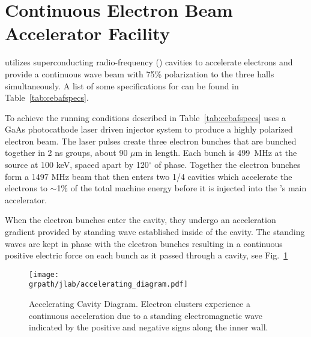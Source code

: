 \section{Continuous Electron Beam Accelerator Facility}\label{sec:cebaf.desc}

 utilizes superconducting radio-frequency (\label{abbr:srf}) cavities to accelerate electrons and provide a continuous wave beam with 75\% polarization to the three halls simultaneously. A list of some specifications for  can be found in Table~\ref{tab:cebafspecs}.
 

To achieve the running conditions described in Table~\ref{tab:cebafspecs}  uses a GaAs photocathode laser driven injector system to produce a highly polarized electron beam. The laser pulses create three electron bunches that are bunched together in 2 ns groups, about 90 $\mu$m in length. Each bunch is 499~MHz at the source at 100 keV, spaced apart by 120$^\circ$ of  phase. Together the electron bunches form a 1497 MHz beam that then enters two 1/4  cavities which accelerate the electrons to $\sim$1\% of the total machine energy before it is injected into the 's main accelerator. 

When the electron bunches enter the   cavity, they undergo an acceleration gradient provided by  standing wave established inside of the cavity. The standing waves are kept in phase with the electron bunches resulting in a continuous positive electric force on each bunch as it passed through a cavity, see Fig.~\ref{fig:jlab.accel}

\begin{figure}\begin{center}
\texttt{[image: \\grpath/jlab/accelerating\_diagram.pdf]}
\caption[Accelerating Cavity Diagram]{\label{fig:jlab.accel}Accelerating Cavity Diagram. Electron clusters experience a continuous acceleration due to a standing electromagnetic wave indicated by the positive and negative signs along the inner wall.}
\end{center}\end{figure}


